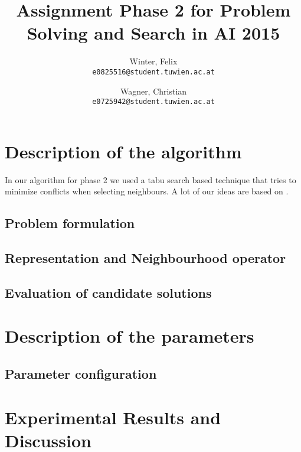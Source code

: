 \documentclass[a4paper]{scrartcl}
\author{
  Winter, Felix\\
  \texttt{e0825516@student.tuwien.ac.at}
  \and
  Wagner, Christian\\
  \texttt{e0725942@student.tuwien.ac.at}
}
\title{Assignment Phase 2 for Problem Solving and Search in AI 2015}
\begin{document}
\setlength{\abovedisplayskip}{0pt}
\setlength{\belowdisplayskip}{0pt}

\begingroup
 \makeatletter
 \maketitle
\endgroup

\section{Description of the algorithm}

In our algorithm for phase 2 we used a tabu search based technique that tries to minimize conflicts when selecting neighbours. A lot of our ideas are based on \cite{malagutitabu}.

\subsection{Problem formulation}


\subsection{Representation and Neighbourhood operator}

\subsection{Evaluation of candidate solutions}




\section{Description of the parameters}


\subsection{Parameter configuration}

\section{Experimental Results and Discussion}









\end{document}
